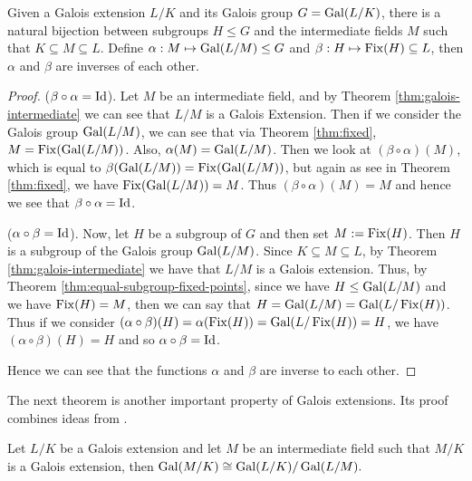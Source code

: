 \begin{theorem} \label{thm:fundamental-theorem} Given a Galois extension $L/K$ and its Galois group $G = \operatorname{Gal}(L/K)$, there is a natural bijection between subgroups $H\leq G$ and the intermediate fields $M$ such that $K \subseteq M \subseteq L$. Define
 $\alpha:M \mapsto \operatorname{Gal}(L/M) \leq G$ and
 $\beta:H \mapsto \operatorname{Fix}(H) \subseteq L$,
then $\alpha$ and $\beta$ are inverses of each other.
\end{theorem}
\begin{proof}

($\beta \circ \alpha = \operatorname{Id}$). Let $M$ be an intermediate field, and by Theorem \ref{thm:galois-intermediate} we can see that $L/M$ is a Galois Extension. Then if we consider the Galois group $\operatorname{Gal}(L/M)$, we can see that via Theorem \ref{thm:fixed}, $M = \operatorname{Fix}(\operatorname{Gal}(L/M))$. Also, $\alpha(M) = \operatorname{Gal}(L/M)$. Then we look at $(\beta \circ \alpha)(M)$, which is equal to $\beta(\operatorname{Gal}(L/M)) = \operatorname{Fix}(\operatorname{Gal}(L/M))$, but again as see in Theorem \ref{thm:fixed}, we have $\operatorname{Fix}(\operatorname{Gal}(L/M)) = M$. Thus $(\beta \circ \alpha)(M) = M$ and hence we see that $\beta \circ \alpha = \operatorname{Id}$.

($\alpha \circ \beta = \operatorname{Id}$). Now, let $H$ be a subgroup of $G$ and then set $M :=\operatorname{Fix}(H)$. Then $H$ is a subgroup of the Galois group $\operatorname{Gal}(L/M)$. Since $K \subseteq M \subseteq L$, by Theorem \ref{thm:galois-intermediate} we have that $L/M$ is a Galois extension. Thus, by Theorem \ref{thm:equal-subgroup-fixed-points}, since we have $H\leq \operatorname{Gal}(L/M)$ and we have $\operatorname{Fix}(H)=M$, then we can say that $H=\operatorname{Gal}(L/M)=\operatorname{Gal}(L/\operatorname{Fix}(H))$. Thus if we consider $(\alpha \circ \beta)(H) = \alpha(\operatorname{Fix}(H)) = \operatorname{Gal}(L/\operatorname{Fix}(H))= H $, we have $(\alpha \circ \beta)(H) = H$ and so $\alpha \circ \beta = \operatorname{Id}$.

Hence we can see that the functions $\alpha$ and $\beta$ are inverse to each other.
\end{proof}

The next theorem is another important property of Galois extensions. Its proof combines ideas from \cite{Stewart, rotman_galois_1998}. 
\begin{theorem} \label{thm:correspondence-quotient}
    Let $L / K$ be a Galois extension and let $M$ be an intermediate field such that $M /K$ is a Galois extension, then 
    $\operatorname{Gal}(M / K) \cong \operatorname{Gal}(L / K) / \operatorname{Gal}(L / M). $
\end{theorem}

